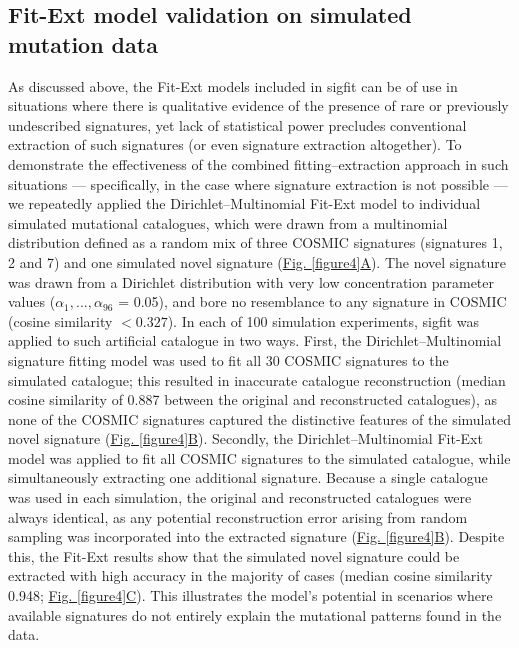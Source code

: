 \subsection*{Fit-Ext model validation on simulated mutation data}
As discussed above, the Fit-Ext models included in sigfit can be of use in situations where there is qualitative evidence of the presence of rare or previously undescribed signatures, yet lack of statistical power precludes conventional extraction of such signatures (or even signature extraction altogether). To demonstrate the effectiveness of the combined fitting–extraction approach in such situations — specifically, in the case where signature extraction is not possible — we repeatedly applied the Dirichlet–Multinomial Fit-Ext model to individual simulated mutational catalogues, which were drawn from a multinomial distribution defined as a random mix of three COSMIC signatures (signatures 1, 2 and 7) and one simulated novel signature (\hyperref[figure4]{Fig. \ref*{figure4}A}). The novel signature was drawn from a Dirichlet distribution with very low concentration parameter values ($\alpha_1, ..., \alpha_{96}$ = 0.05), and bore no resemblance to any signature in COSMIC (cosine similarity $<0.327$). In each of 100 simulation experiments, sigfit was applied to such artificial catalogue in two ways. First, the Dirichlet–Multinomial signature fitting model was used to fit all 30 COSMIC signatures to the simulated catalogue; this resulted in inaccurate catalogue reconstruction (median cosine similarity of 0.887 between the original and reconstructed catalogues), as none of the COSMIC signatures captured the distinctive features of the simulated novel signature (\hyperref[figure4]{Fig. \ref*{figure4}B}). Secondly, the Dirichlet–Multinomial Fit-Ext model was applied to fit all COSMIC signatures to the simulated catalogue, while simultaneously extracting one additional signature. Because a single catalogue was used in each simulation, the original and reconstructed catalogues were always identical, as any potential reconstruction error arising from random sampling was incorporated into the extracted signature (\hyperref[figure4]{Fig. \ref*{figure4}B}). Despite this, the Fit-Ext results show that the simulated novel signature could be extracted with high accuracy in the majority of cases (median cosine similarity 0.948; \hyperref[figure4]{Fig. \ref*{figure4}C}). This illustrates the model's potential in scenarios where available signatures do not entirely explain the mutational patterns found in the data.